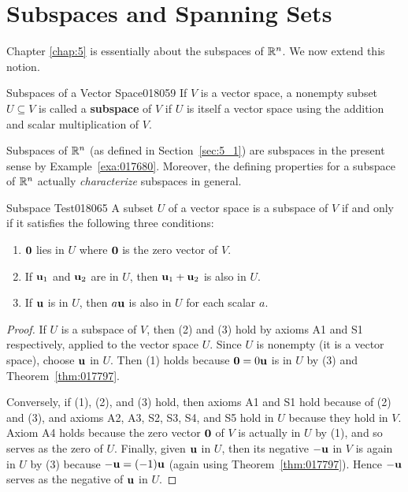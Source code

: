 \section{Subspaces and Spanning Sets}
\label{sec:6_2}

\noindent Chapter \ref{chap:5} is essentially about the subspaces of $\mathbb{R}^n$. We now extend this notion.

\begin{definition}{Subspaces of a Vector Space}{018059}
If $V$ is a vector space, a nonempty subset $U \subseteq V$ is called a \textbf{subspace} of $V$ if $U$ is itself a vector space using the addition and scalar multiplication of $V$.
\end{definition}

\noindent Subspaces of $\mathbb{R}^n$ (as defined in Section~\ref{sec:5_1}) are subspaces in the present sense by Example~\ref{exa:017680}. Moreover, the defining properties for a subspace of $\mathbb{R}^n$ actually \textit{characterize} subspaces in general.

\newpage
\begin{theorem}{Subspace Test}{018065}%
A subset $U$ of a vector space is a subspace of $V$ if and only if it satisfies the following three conditions:

\begin{enumerate}
\item $\textbf{0}$ lies in $U$ where $\textbf{0}$ is the zero vector of $V$.

\item If $\textbf{u}_{1}$ and $\textbf{u}_{2}$ are in $U$, then $\textbf{u}_{1} + \textbf{u}_{2}$ is also in $U$.

\item If $\textbf{u}$ is in $U$, then $a\textbf{u}$ is also in $U$ for each scalar $a$.

\end{enumerate}
\end{theorem}

\begin{proof}
If $U$ is a subspace of $V$, then (2) and (3) hold by axioms A1 and S1 respectively, applied to the vector space $U$. Since $U$ is nonempty (it is a vector space), choose $\textbf{u}$ in $U$. Then (1) holds because $\textbf{0} = 0\textbf{u}$ is in $U$ by (3) and Theorem~\ref{thm:017797}.

Conversely, if (1), (2), and (3) hold, then axioms A1 and S1 hold because of (2) and (3), and axioms A2, A3, S2, S3, S4, and S5 hold in $U$ because they hold in $V$. Axiom A4 holds because the zero vector $\textbf{0}$ of $V$ is actually in $U$ by (1), and so serves as the zero of $U$. Finally, given $\textbf{u}$ in $U$, then its negative $-\textbf{u}$ in $V$ is again in $U$ by (3) because $-\textbf{u} = (-1)\textbf{u}$ (again using Theorem~\ref{thm:017797}). Hence $-\textbf{u}$ serves as the negative of $\textbf{u}$ in $U$.
\end{proof}

